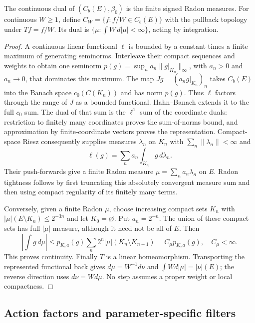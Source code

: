 \begin{theorem}
\label{prop:r33-c2-strict}
The continuous dual of $(C_b(E),\beta_0)$ is the finite signed Radon
measures.  For continuous $W\ge1$, define $C_W=\{f:f/W\in C_b(E)\}$ with
the pullback topology under $Tf=f/W$.  Its dual is
$\{\mu:\int W\,d|\mu|<\infty\}$, acting by integration.
\end{theorem}
\begin{proof}
A continuous linear functional $\ell$ is bounded by a constant times a finite
maximum of generating seminorms.  Interleave their compact sequences and
weights to obtain one seminorm
$p(g)=\sup_n a_n\|g|_{K_n}\|_\infty$, with $a_n>0$ and $a_n\to0$,
that dominates this maximum.  The map
$Jg=(a_ng|_{K_n})_n$ takes $C_b(E)$ into the Banach space
$c_0(C(K_n))$ and has norm $p(g)$.  Thus $\ell$ factors through the range
of $J$ as a bounded functional.  Hahn--Banach extends it to the full
$c_0$ sum.  The dual of that sum is the $\ell^1$ sum of the coordinate
duals: restriction to finitely many coordinates proves the sum-of-norms
bound, and approximation by finite-coordinate vectors proves the
representation.  Compact-space Riesz consequently supplies measures
$\lambda_n$ on $K_n$ with $\sum_n\|\lambda_n\|<\infty$ and
\[
 \ell(g)=\sum_n a_n\int_{K_n}g\,d\lambda_n.
\]
Their push-forwards give a finite Radon measure
$\mu=\sum_n a_n\lambda_n$ on $E$.  Radon tightness follows by first
truncating this absolutely convergent measure sum and then using compact
regularity of its finitely many terms.

Conversely, given a finite Radon $\mu$, choose increasing compact sets $K_n$
with $|\mu|(E\setminus K_n)\le2^{-3n}$ and let $K_0=\varnothing$.
Put $a_n=2^{-n}$.  The union of these compact sets has full $|\mu|$ measure,
although it need not be all of $E$.  Then
\[
 \left|\int g\,d\mu\right|
 \le p_{K,a}(g)\sum_n 2^n|\mu|(K_n\setminus K_{n-1}) = C_\mu p_{K,a}(g),\quad C_\mu<\infty.
\]
This proves continuity.  Finally $T$ is a linear homeomorphism.  Transporting
the represented functional back gives $d\mu=W^{-1}d\nu$ and
$\int Wd|\mu|=|\nu|(E)$; the reverse direction uses $d\nu=Wd\mu$.
No step assumes a proper weight or local compactness.
\end{proof}

\subsection{Action factors and parameter-specific filters}


